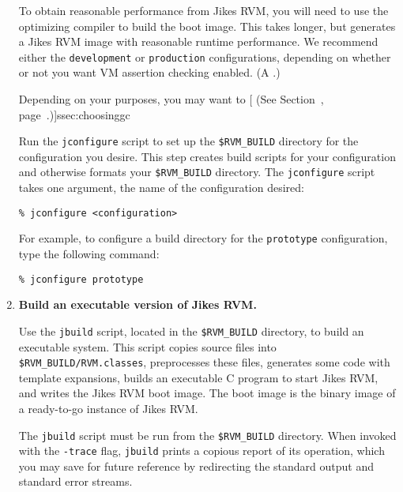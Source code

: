 \begin{enumerate}
%
%
To obtain reasonable performance from Jikes RVM, you will need to use
the optimizing compiler to build the boot image.  This takes longer,
but generates a Jikes RVM image with reasonable runtime performance.
We recommend either the \texttt{development} or \texttt{production}
configurations, 
depending on whether or not you want VM assertion checking enabled.  (A
.) 

Depending on your purposes, you may want to [ (See
Section~\Ref{}, page~\Pageref.)]{ssec:choosinggc}

Run the \texttt{jconfigure} script to set up the \texttt{\$RVM\_BUILD}
directory for the configuration you desire.  This step creates
build scripts for your configuration and otherwise formats your
\texttt{\$RVM\_BUILD} directory.
The \texttt{jconfigure} script takes one argument, the name of the
configuration desired: 

\begin{verbatim}
% jconfigure <configuration>
\end{verbatim}

For example, to configure a build directory for the 
\texttt{prototype} configuration, type the following command:

\begin{verbatim}
% jconfigure prototype
\end{verbatim}

%
%
%
\item {\bf Build an executable version of Jikes RVM.}  

Use the \texttt{jbuild} script, located in the \texttt{\$RVM\_BUILD} directory,
to build an executable system.  This script copies source files into
\texttt{\$RVM\_BUILD/RVM.classes}, preprocesses these files, generates
some code with template expansions, builds an executable C program to
start Jikes RVM, and writes the Jikes RVM boot image.  The boot
image is the binary image of a ready-to-go instance of Jikes RVM.\@

The \texttt{jbuild} script must be run from the \texttt{\$RVM\_BUILD}
directory.  When invoked with the \texttt{-trace} flag,
\texttt{jbuild} prints a copious report of its operation, which you may 
save for future reference by redirecting the standard output and
standard error streams.


\end{enumerate}

